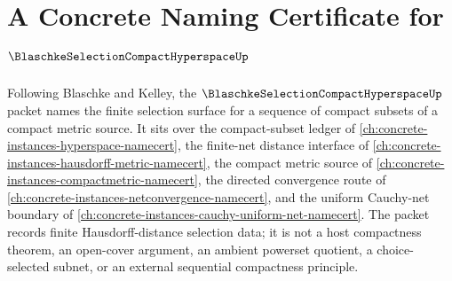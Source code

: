\chapter{A Concrete Naming Certificate for $\BlaschkeSelectionCompactHyperspaceUp$}
\label{ch:concrete-instances-blaschke-selection-compact-hyperspace-namecert}

Following Blaschke and Kelley, the $\BlaschkeSelectionCompactHyperspaceUp$ packet names the finite selection surface for a sequence of compact subsets of a compact metric source. It sits over the compact-subset ledger of \autoref{ch:concrete-instances-hyperspace-namecert}, the finite-net distance interface of \autoref{ch:concrete-instances-hausdorff-metric-namecert}, the compact metric source of \autoref{ch:concrete-instances-compactmetric-namecert}, the directed convergence route of \autoref{ch:concrete-instances-netconvergence-namecert}, and the uniform Cauchy-net boundary of \autoref{ch:concrete-instances-cauchy-uniform-net-namecert}. The packet records finite Hausdorff-distance selection data; it is not a host compactness theorem, an open-cover argument, an ambient powerset quotient, a choice-selected subnet, or an external sequential compactness principle.

